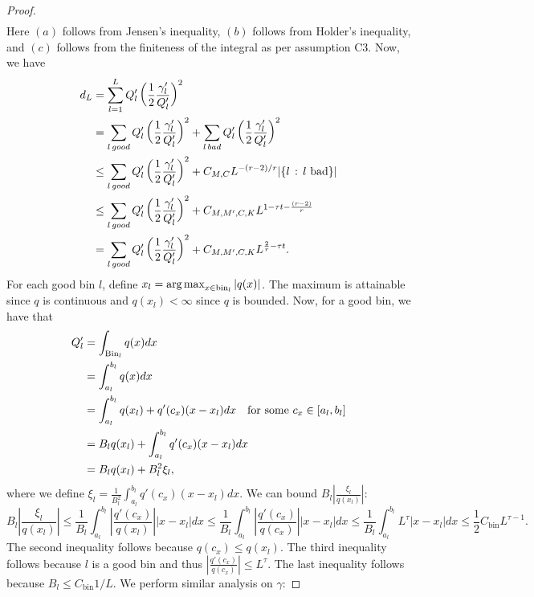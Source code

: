 \documentclass{article}
\newcommand{\bin}{\text{bin}}
\begin{document}
\begin{proof}
\begin{align*}
\end{align*}
Here $(a)$ follows from Jensen's inequality, $(b)$ follows from Holder's inequality, and $(c)$ follows from the finiteness of the integral as per assumption C3. Now, we have
\begin{align*}
d_L &= \sum_{l=1}^L Q_l' \left( \frac{1}{2} \frac{\gamma_l'}{Q_l'} \right)^2 \\
  &= \sum_{l \, good} Q_l' \left( \frac{1}{2} \frac{\gamma_l'}{Q_l'} \right)^2 + 
      \sum_{l \, bad} Q_l' \left( \frac{1}{2} \frac{\gamma_l'}{Q_l'} \right)^2 \\
   &\leq   \sum_{l \, good} Q_l' \left( \frac{1}{2} \frac{\gamma_l'}{Q_l'} \right)^2 + 
       C_{M, C} L^{-(r-2)/r} | \{ l \,:\, l \textrm{ bad} \}| \\
   &\leq  \sum_{l \, good} Q_l' \left( \frac{1}{2} \frac{\gamma_l'}{Q_l'} \right)^2 + 
          C_{M, M', C, K} L^{1 - \tau t - \frac{(r-2)}{r}} \\
  &=  \sum_{l \, good} Q_l' \left( \frac{1}{2} \frac{\gamma_l'}{Q_l'} \right)^2 + 
        C_{M, M', C, K} L^{\frac{2}{r} - \tau t}. 
\end{align*}
For each good bin $l$, define $x_l = \argmax_{x \in \bin_l} | q(x) |$. The maximum is attainable since $q$ is continuous and $q(x_l) < \infty$ since $q$ is bounded. Now, for a good bin, we have that 
\begin{align*}
Q_l' &= \int_{\textrm{Bin}_l} q(x) dx \\
  &= \int_{a_l}^{b_l} q(x) dx \\
 &= \int_{a_l}^{b_l} q(x_l) + q'(c_x) (x - x_l) dx \quad \textrm{for some $c_x \in [a_l, b_l]$}\\
 &= B_l q(x_l) + \int_{a_l}^{b_l} q'(c_x)(x-x_l) dx  \\
 &= B_l q(x_l) + B_l^2 \xi_l,
\end{align*}
where we define $\xi_l = \frac{1}{B_l^2} \int_{a_l}^{b_l} q'(c_x) (x-x_l) dx$. We can bound $B_l \left| \frac{\xi_l}{q(x_l)} \right|$:
$$
B_l \left| \frac{\xi_l}{q(x_l)} \right| 
    \leq \frac{1}{B_l} \int_{a_l}^{b_l} \left|\frac{q'(c_x)}{q(x_l)} \right| |x - x_l| dx 
   \leq \frac{1}{B_l} \int_{a_l}^{b_l} \left|\frac{q'(c_x)}{q(c_x)} \right| |x - x_l| dx 
                \leq \frac{1}{B_l} \int_{a_l}^{b_l} L^{\tau} |x - x_l| dx \leq 
 \frac{1}{2} C_\bin L^{\tau - 1}. 
$$ 
The second inequality follows because $q(c_x) \leq q(x_l)$. The third inequality follows because $l$ is a good bin and thus
$\left| \frac{q'(c_x)}{q(c_x)} \right| \leq L^\tau$. The last inequality follows because $B_l \leq C_\bin 1/L$. We perform similar analysis on $\gamma$:

\end{proof}
\end{document}
